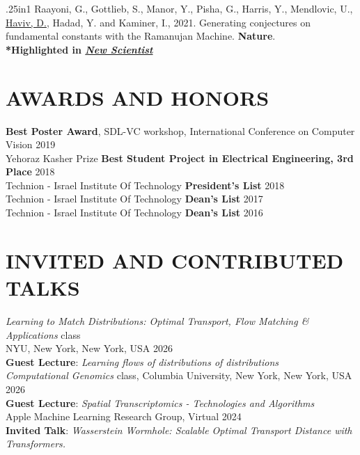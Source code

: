 \documentclass[a4paper,9pt]{extarticle}
\begin{document}
\begin{hangparas}{.25in}{1}
{Raayoni, G., Gottlieb, S., Manor, Y., Pisha, G., Harris, Y., Mendlovic, U., \underline{Haviv, D.}, Hadad, Y. and Kaminer, I., 2021. Generating conjectures on fundamental constants with the Ramanujan Machine. \textbf{Nature}.\\
\textbf{*Highlighted in \href{https://www.newscientist.com/article/2209213-computer-attempts-to-replicate-the-dream-like-maths-of-ramanujan/}{\textit{New Scientist}}}\\

}

\end{hangparas}



\section*{AWARDS AND HONORS}
\noindent
\normalsize
\textbf{Best Poster Award}, SDL-VC workshop, International Conference on Computer Vision	\hfill 2019 \\
Yehoraz Kasher Prize \textbf{Best Student Project in Electrical Engineering, 3rd Place} 	\hfill 2018 \\
Technion - Israel Institute Of Technology \textbf{President's List}	\hfill 2018 \\
Technion - Israel Institute Of Technology \textbf{Dean's List}	\hfill 2017 \\
Technion - Israel Institute Of Technology \textbf{Dean's List}	\hfill 2016 \\

\section*{INVITED AND CONTRIBUTED TALKS}

\noindent
\textit{Learning to Match Distributions: Optimal Transport, Flow Matching \& Applications} class \\
NYU, New York, New York, USA \hfill 2026 \\
\textbf{Guest Lecture}: \textit{Learning flows of distributions of distributions}\\

\noindent
\textit{Computational Genomics} class, Columbia University, New York, New York, USA \hfill  2026 \\
\textbf{Guest Lecture}: \textit{Spatial Transcriptomics - Technologies and Algorithms}	\\

\noindent
Apple Machine Learning Research Group, Virtual \hfill  2024 \\
\textbf{Invited Talk}: \textit{Wasserstein Wormhole: Scalable
Optimal Transport Distance with Transformers. }	\\
\end{document}
